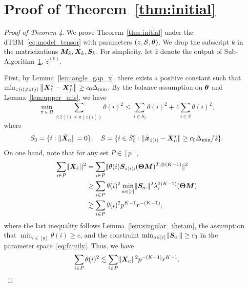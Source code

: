 \documentclass[lettersize,onecolumn,journal]{IEEEtran}
\theoremstyle{definition}
\theoremstyle{definition}
\begin{document}
\section*{Proof of Theorem~\ref{thm:initial}}
\begin{proof}[Proof of Theorem 4] We prove Theorem~\ref{thm:initial} under the dTBM~\eqref{eq:model_tensor} with parameters $(z, \mathcal{S}, \boldsymbol{\theta})$. We drop the subscript $k$ in the matricizations $\bm M_k, \bm X_k, \bm S_k$. For simplicity, let $\hat z$ denote the output of Sub-Algorithm~\hyperref[alg:main]{1}, $\hat z^{(0)}$.

First, by Lemma~\ref{lem:angle_gap_x}, there exists a positive constant such that $\min_{z(i) \neq z(j)} \left\lVert \bm X^s_{i:} - \bm X^s_{j:} \right\rVert \geq c_0  \Delta_{\min}$. By the balance assumption on $\boldsymbol{\theta}$ and Lemma~\ref{lem:upper_mis}, we have 
 \begin{equation}\label{eq:theta_bound}
          \min_{\pi \in \Pi} \sum_{i : \hat z(i) \neq \pi(z(i))} \theta(i)^2  \leq  \sum_{i \in S_I} \theta(i)^2 + 4 \sum_{i \in S} \theta(i)^2 ,
    \end{equation}
    where 
    \begin{equation}
        S_0 = \{i: \lVert\hat {\bm X}_{i:}\rVert = 0\}, \quad S = \{i \in S_0^c: \lVert\hat {\bm x}_{\hat z(i)} - \bm X_{i:}^s \rVert \geq c_0  \Delta_{\min}/2\}.
    \end{equation}
    On one hand, note that for any set $P \in [p]$,
    \begin{align}
        \sum_{i \in P} \lVert\bm X_{i:}\rVert^2 &= \sum_{i \in P} \lVert \theta(i) \bm S_{z(i):} (\boldsymbol{\Theta} \bm M)^{T, \otimes (K-1)} \rVert^2 \\
        & \geq \sum_{i \in P} \theta(i)^2 \min_{a \in [r]} \lVert\bm S_{a:}\rVert^2 \lambda_{r}^{2(K-1)} (\boldsymbol{\Theta} \bm M)\\
        & \gtrsim \sum_{i \in P} \theta(i)^2 p^{K-1} r^{-(K-1)}, 
    \end{align}
    where the last inequality follows Lemma~\ref{lem:singular_thetam}, the assumption that $\min_{i \in [p]} \theta(i) \geq c$, and the constraint $\min_{a \in [r]} \lVert\bm S_{a:}\rVert \geq c_3$ in the parameter space~\eqref{eq:family}. Thus, we have 
    \begin{equation}\label{eq:theta_p}
        \sum_{i \in P} \theta(i)^2 \lesssim \sum_{i \in P} \onormSize{}{\mX_{i:}}^2 p^{-(K-1)} r^{K-1}.
    \end{equation}
    

\end{proof}
\end{document}
